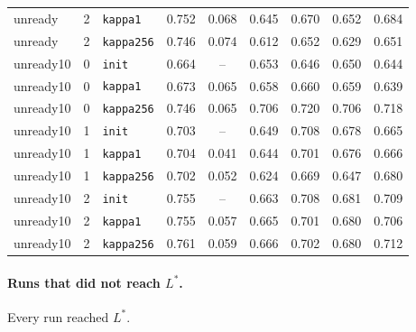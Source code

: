 \begin{table}[htbp]
{\begin{tabular}{lllcccccc}
unready & 2 & \texttt{kappa1} & 0.752 & 0.068 & 0.645 & 0.670 & 0.652 & 0.684 \\
unready & 2 & \texttt{kappa256} & 0.746 & 0.074 & 0.612 & 0.652 & 0.629 & 0.651 \\
unready10 & 0 & \texttt{init} & 0.664 & -- & 0.653 & 0.646 & 0.650 & 0.644 \\
unready10 & 0 & \texttt{kappa1} & 0.673 & 0.065 & 0.658 & 0.660 & 0.659 & 0.639 \\
unready10 & 0 & \texttt{kappa256} & 0.746 & 0.065 & 0.706 & 0.720 & 0.706 & 0.718 \\
unready10 & 1 & \texttt{init} & 0.703 & -- & 0.649 & 0.708 & 0.678 & 0.665 \\
unready10 & 1 & \texttt{kappa1} & 0.704 & 0.041 & 0.644 & 0.701 & 0.676 & 0.666 \\
unready10 & 1 & \texttt{kappa256} & 0.702 & 0.052 & 0.624 & 0.669 & 0.647 & 0.680 \\
unready10 & 2 & \texttt{init} & 0.755 & -- & 0.663 & 0.708 & 0.681 & 0.709 \\
unready10 & 2 & \texttt{kappa1} & 0.755 & 0.057 & 0.665 & 0.701 & 0.680 & 0.706 \\
unready10 & 2 & \texttt{kappa256} & 0.761 & 0.059 & 0.666 & 0.702 & 0.680 & 0.712 \\
\bottomrule\end{tabular}}\end{table}
\paragraph{Runs that did not reach $L^\ast$.}
Every run reached $L^\ast$.
